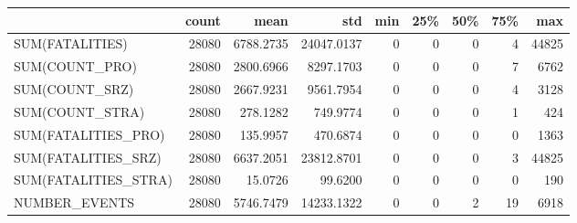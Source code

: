 \begin{tabular}{lrrrrrrrr}
\toprule
{} &  count &       mean &         std &  min &  25\% &  50\% &  75\% &    max \\
\midrule
SUM(FATALITIES)      &  28080 &  6788.2735 &  24047.0137 &    0 &    0 &    0 &    4 &  44825 \\
SUM(COUNT\_PRO)       &  28080 &  2800.6966 &   8297.1703 &    0 &    0 &    0 &    7 &   6762 \\
SUM(COUNT\_SRZ)       &  28080 &  2667.9231 &   9561.7954 &    0 &    0 &    0 &    4 &   3128 \\
SUM(COUNT\_STRA)      &  28080 &   278.1282 &    749.9774 &    0 &    0 &    0 &    1 &    424 \\
SUM(FATALITIES\_PRO)  &  28080 &   135.9957 &    470.6874 &    0 &    0 &    0 &    0 &   1363 \\
SUM(FATALITIES\_SRZ)  &  28080 &  6637.2051 &  23812.8701 &    0 &    0 &    0 &    3 &  44825 \\
SUM(FATALITIES\_STRA) &  28080 &    15.0726 &     99.6200 &    0 &    0 &    0 &    0 &    190 \\
NUMBER\_EVENTS        &  28080 &  5746.7479 &  14233.1322 &    0 &    0 &    2 &   19 &   6918 \\
\bottomrule
\end{tabular}
